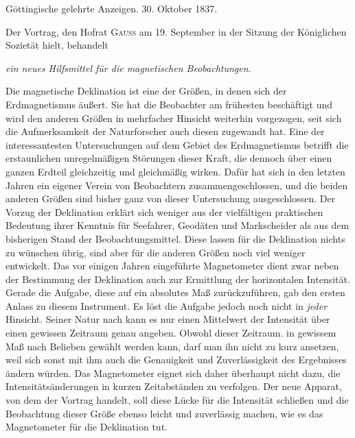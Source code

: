 \clearpage
{}
\begin{center}
Göttingische gelehrte Anzeigen. 30. Oktober 1837.
\end{center}

Der Vortrag, den Hofrat \textsc{Gauss} am 19. September in der Sitzung der Königlichen Sozietät hielt, behandelt
\begin{center}
\textit{ein neues Hilfsmittel für die magnetischen Beobachtungen.}
\end{center}

Die magnetische Deklination ist eine der Größen, in denen sich der Erdmagnetismus äußert. Sie hat die Beobachter am frühesten beschäftigt und wird den anderen Größen in mehrfacher Hinsicht weiterhin vorgezogen, seit sich die Aufmerksamkeit der Naturforscher auch diesen zugewandt hat. Eine der interessantesten Untersuchungen auf dem Gebiet des Erdmagnetismus betrifft die erstaunlichen unregelmäßigen Störungen dieser Kraft, die dennoch über einen ganzen Erdteil gleichzeitig und gleichmäßig wirken. Dafür hat sich in den letzten Jahren ein eigener Verein von Beobachtern zusammengeschlossen, und die beiden anderen Größen sind bisher ganz von dieser Untersuchung ausgeschlossen. Der Vorzug der Deklination erklärt sich weniger aus der vielfältigen praktischen Bedeutung ihrer Kenntnis für Seefahrer, Geodäten und Markscheider als aus dem bisherigen Stand der Beobachtungsmittel. Diese lassen für die Deklination nichts zu wünschen übrig, sind aber für die anderen Größen noch viel weniger entwickelt. Das vor einigen Jahren eingeführte Magnetometer dient zwar neben der Bestimmung der Deklination auch zur Ermittlung der horizontalen Intensität. Gerade die Aufgabe, diese auf ein absolutes Maß zurückzuführen, gab den ersten Anlass zu diesem Instrument. Es löst die Aufgabe jedoch noch nicht in \textit{jeder} Hinsicht. Seiner Natur nach kann es nur einen Mittelwert der Intensität über einen gewissen Zeitraum genau angeben. Obwohl dieser Zeitraum. in gewissem Maß nach Belieben gewählt werden kann, darf man ihn nicht zu kurz ansetzen, weil sich sonst mit ihm auch die Genauigkeit und Zuverlässigkeit des Ergebnisses ändern würden. Das Magnetometer eignet sich daher überhaupt nicht dazu, die Intensitätsänderungen in kurzen Zeitabständen zu verfolgen. Der neue Apparat, von dem der Vortrag handelt, soll diese Lücke für die Intensität schließen und die Beobachtung dieser Größe ebenso leicht und zuverlässig machen, wie es das Magnetometer für die Deklination tut.

